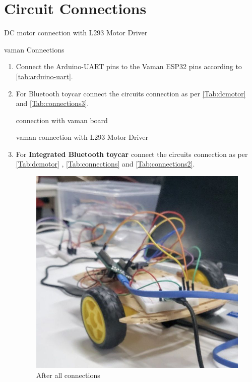 \section{Circuit Connections}

\begin{table}[!ht]
\centering
	
	\caption{DC motor connection with L293 Motor Driver }
	\label{Tab:dcmotor}
\end{table}

\begin{table}[!ht]
\centering
	
	\caption{ vaman Connections}
	\label{Tab:connections3}
\end{table}
\begin{enumerate}[label=\thesection.\arabic*.,ref=\thesection.\theenumi]

\item Connect the Arduino-UART pins to the Vaman ESP32 pins according to \autoref{tab:arduino-uart}.
\item For Bluetooth toycar connect the circuits connection as per \autoref{Tab:dcmotor} and  \autoref{Tab:connections3}.
\begin{table}[!ht]
\centering
	
	\caption{connection with vaman board }
	\label{Tab:connections}
\end{table}
\begin{table}[!ht]
\centering
	
	\caption{vaman connection with L293 Motor Driver}
	\label{Tab:connections2}
\end{table}
\item For \textbf{Integrated Bluetooth toycar} connect the circuits connection
as per \autoref{Tab:dcmotor} , \autoref{Tab:connections} and
\autoref{Tab:connections2}.

\begin{figure}[!ht]
\centering
\includegraphics[width=0.3\columnwidth]{ugv/figs/8.jpg}
\caption{After all connections}
\end{figure}
\end{enumerate}

